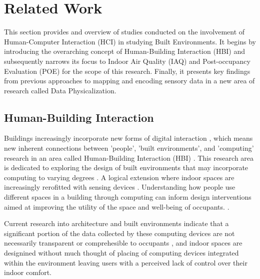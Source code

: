 \section{Related Work}
\label{sec:related_work}

This section provides and overview of studies conducted on the involvement of Human-Computer Interaction (HCI) in studying Built Environments. It begins by introducing the overarching concept of Human-Building Interaction (HBI) and subsequently narrows its focus to Indoor Air Quality (IAQ) and Post-occupancy Evaluation (POE) for the scope of this research. Finally, it presents key findings from previous approaches to mapping and encoding sensory data in a new area of research called Data Physicalization.

\subsection{Human-Building Interaction}

Buildings increasingly incorporate new forms of digital interaction \cite{pulsipher_towards_2023, margariti_understanding_2023}, which means new inherent connections between 'people', 'built environments', and 'computing' research in an area called Human-Building Interaction (HBI) \cite{alavi_introduction_2019, taherkhani_human-building_2023}. This research area is dedicated to exploring the design of built environments that may incorporate computing to varying degrees \cite{sowles_introducing_2021}.  A logical extension where indoor spaces are increasingly rerofitted with sensing devices \cite{pulsipher_towards_2023}. Understanding how people use different spaces in a building through computing can inform design interventions aimed at improving the utility of the space and well-being of occupants. \cite{verma_studying_2017}. 

Current research into architecture and built environments indicate that a significant portion of the data collected by these computing devices are not necessarily transparent or comprehesible to occupants \cite{schnadelbach_adaptive_2019}, and indoor spaces are designined without much thought of placing of computing devices integrated within the environment \cite{johansen_temporal_2019, kirsh_architects_2019} leaving users with a perceived lack of control over their indoor comfort. 


